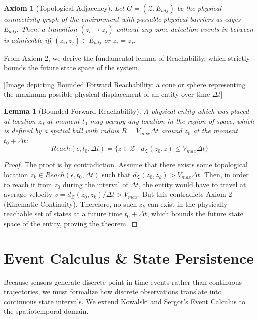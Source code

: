 \documentclass[conference]{IEEEtran}
\newtheorem{lemma}{Lemma}
\newtheorem{axiom}{Axiom}
\newcommand{\Z}{\mathcal{Z}} %
\begin{document}
\begin{axiom}[Topological Adjacency]
Let $G = (\Z, E_{adj})$ be the physical connectivity graph of the environment with passable physical barriers as edges $E_{adj}$. Then, a transition $(z_i \to z_j)$ without any zone detection events in between is admissible iff $(z_i, z_j) \in E_{adj}$ or $z_i = z_j$.
\end{axiom}

From Axiom 2, we derive the fundamental lemma of Reachability, which strictly bounds the future state space of the system.

[Image depicting Bounded Forward Reachability: a cone or sphere representing the maximum possible physical displacement of an entity over time $\Delta t$]

\begin{lemma}[Bounded Forward Reachability]
A physical entity which was placed at location $z_0$ at moment $t_0$ may occupy any location in the region of space, which is defined by a spatial ball with radius $R = V_{max}\Delta t$ around $z_0$ at the moment $t_0+\Delta t$:
\begin{equation}
Reach(\epsilon, t_0, \Delta t) = \{ z \in \Z \mid d_\Z(z_0, z) \le V_{max} \Delta t \}
\end{equation}
\end{lemma}
\begin{proof}
The proof is by contradiction. Assume that there exists some topological location $z_k \in Reach(\epsilon, t_0, \Delta t)$ such that $d_\Z(z_0, z_k) > V_{max} \Delta t$. Then, in order to reach it from $z_0$ during the interval of $\Delta t$, the entity would have to travel at average velocity $v = d_\Z(z_0, z_k) / \Delta t > V_{max}$. But this contradicts Axiom 2 (Kinematic Continuity). Therefore, no such $z_k$ can exist in the physically reachable set of states at a future time $t_0 + \Delta t$, which bounds the future state space of the entity, proving the theorem.
\end{proof}

\section{Event Calculus \& State Persistence}

Because sensors generate discrete point-in-time events rather than continuous trajectories, we must formalize how discrete observations translate into continuous state intervals. We extend Kowalski and Sergot's Event Calculus \cite{b2} to the spatiotemporal domain.
\end{document}
